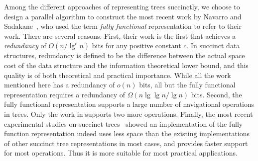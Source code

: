 Among the different approaches of representing trees succinctly, we choose to design a parallel algorithm to construct the most recent work by Navarro and Sadakane~\cite{Navarro:2014:FFS:2620785.2601073}, who used the term {\em fully functional} representation to refer to their work. There are several reasons. 
First, their work is the first that achieves a {\em redundancy} of $O(n/\lg^c n)$ bits for any positive constant $c$. 
In succinct data structures, redundancy is defined to be the difference between the actual space cost of the data structure and the information theoretical lower bound, and this quality is of both theoretical and practical importance. 
While all the work mentioned here has a redundancy of $o(n)$ bits, all but the fully functional representation requires a redundancy of $\Omega(n \lg\lg n / \lg n)$ bits. 
Second, the fully functional representation supports a large number of navigational operations in trees. Only the work in \cite{hms2012,fm2014} supports two more operations.
%
%
Finally, the most recent experimental studies on succinct trees~\cite{ACNSalenex10} showed an implementation of the fully function representation indeed uses less space than the existing implementations of other succinct tree representations in most cases, and provides faster support for most operations. Thus it is more suitable for most practical applications. 
%
